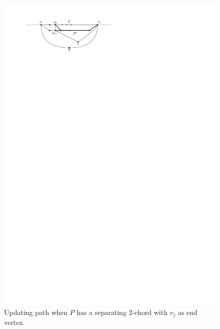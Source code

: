     \begin{figure}[t]
      \centering
      \includegraphics[scale=1]{unifiedAlgo/img/sweep/cases/pEBound}
      \caption{Updating path when $P$ has a separating 2-chord with $v_j$ as end vertex.}
      \label{fig:sweep:pEBound}

\end{figure}

